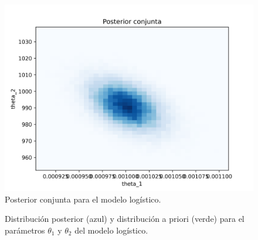 \begin{figure}
    \centering 
    \includegraphics[width = 10 cm ]{img/Exp_Central_logistico_sigma/Figuras/Generales/Conjunta_logistico_sigma.png} 
    \caption{Posterior conjunta para el modelo logístico.}
    \label{Fig. 3.2.log.conjunta}
\end{figure} 

\begin{figure}
    \centering
    \qquad
    \caption{Distribución posterior (azul) y distribución a priori (verde) para el parámetros $\theta_1$ y $\theta_2$ del modelo logístico.}
    \label{Fig. 3.2.log.theta}
\end{figure}

